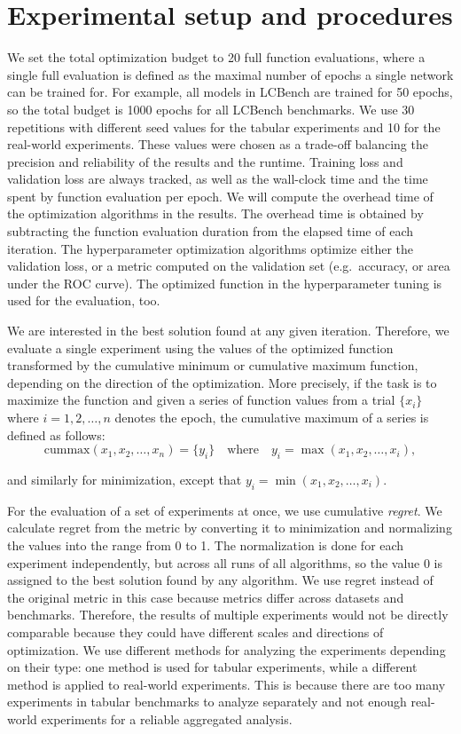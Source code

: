 \section{Experimental setup and procedures}
We set the total optimization budget to 20 full function evaluations, where a single full evaluation is defined as the maximal number of epochs a single network can be trained for. For example, all models in LCBench are trained for 50 epochs, so the total budget is 1000 epochs for all LCBench benchmarks. We use 30 repetitions with different seed values for the tabular experiments and 10 for the real-world experiments. These values were chosen as a trade-off balancing the precision and reliability of the results and the runtime. Training loss and validation loss are always tracked, as well as the wall-clock time and the time spent by function evaluation per epoch. We will compute the overhead time of the optimization algorithms in the results. The overhead time is obtained by subtracting the function evaluation duration from the elapsed time of each iteration. The hyperparameter optimization algorithms optimize either the validation loss, or a metric computed on the validation set (e.g.\ accuracy, or area under the ROC curve). The optimized function in the hyperparameter tuning is used for the evaluation, too.

We are interested in the best solution found at any given iteration. Therefore, we evaluate a single experiment using the values of the optimized function transformed by the cumulative minimum or cumulative maximum function, depending on the direction of the optimization. More precisely, if the task is to maximize the function and given a series of function values from a trial \( \{x_i\} \) where \( i = 1, 2, \ldots, n \) denotes the epoch, the cumulative maximum of a series is defined as follows:
\[
\text{cummax}(x_1, x_2, \ldots, x_n) = \{y_i\} \quad \text{where} \quad y_i = \max(x_1, x_2, \ldots, x_i),
\]

\noindent
and similarly for minimization, except that $y_i = \min(x_1, x_2, \ldots, x_i)$.

For the evaluation of a set of experiments at once, we use cumulative \textit{regret}. We calculate regret from the metric by converting it to minimization and normalizing the values into the range from 0 to 1. The normalization is done for each experiment independently, but across all runs of all algorithms, so the value 0 is assigned to the best solution found by any algorithm. We use regret instead of the original metric in this case because metrics differ across datasets and benchmarks. Therefore, the results of multiple experiments would not be directly comparable because they could have different scales and directions of optimization. We use different methods for analyzing the experiments depending on their type: one method is used for tabular experiments, while a different method is applied to real-world experiments. This is because there are too many experiments in tabular benchmarks to analyze separately and not enough real-world experiments for a reliable aggregated analysis.

